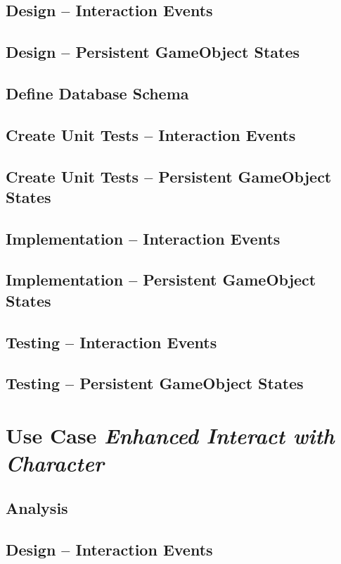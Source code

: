 \documentclass[11pt]{article}
\begin{document}
\subsection{Design -- Interaction Events}
\label{sec:org411a082}
\subsection{Design -- Persistent GameObject States}
\label{sec:org1f91e58}
\subsection{Define Database Schema}
\label{sec:org9f3e5c5}
\subsection{Create Unit Tests -- Interaction Events}
\label{sec:org46e1919}
\subsection{Create Unit Tests -- Persistent GameObject States}
\label{sec:orga33e4cd}
\subsection{Implementation -- Interaction Events}
\label{sec:orga552d76}
\subsection{Implementation -- Persistent GameObject States}
\label{sec:org4b1b210}
\subsection{Testing -- Interaction Events}
\label{sec:org6174bc1}
\subsection{Testing -- Persistent GameObject States}
\label{sec:orgfabaa6a}
\section{Use Case \emph{Enhanced Interact with Character}}
\label{sec:orgf8fca36}
\subsection{Analysis}
\label{sec:orgf8bfb57}
\subsection{Design -- Interaction Events}
\label{sec:orgaac5fff}
\end{document}
